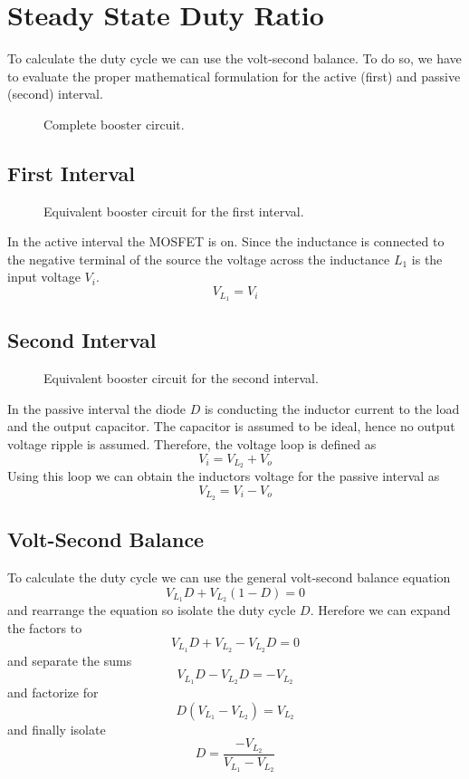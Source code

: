 \section{Steady State Duty Ratio}
To calculate the duty cycle we can use the volt-second balance.
To do so, we have to evaluate the proper mathematical formulation
for the active (first) and passive (second) interval.

\begin{figure}[h!]
	\centering
	\def\svgscale{\schematicscale}
	
	\caption{Complete booster circuit.}
\end{figure}

\subsection{First Interval}

\begin{figure}[h!]
	\centering
	\def\svgscale{\schematicscale}
	
	\caption{Equivalent booster circuit for the first interval.}
\end{figure}

In the active interval the MOSFET is on. Since the inductance is
connected to the negative terminal of the source the voltage across
the inductance $L_1$ is the input voltage $V_i$. 
\[ V_{L_{1}} = V_i \]

\subsection{Second Interval}

\begin{figure}[h!]
	\centering
	\def\svgscale{\schematicscale}
	
	\caption{Equivalent booster circuit for the second interval.}
\end{figure}

In the passive interval the diode $D$ is conducting the inductor
current to the load and the output capacitor. The capacitor is assumed
to be ideal, hence no output voltage ripple is assumed. Therefore, the
voltage loop is defined as
\[ V_i = V_{L_{2}} + V_o \]
Using this loop we can obtain the inductors voltage for the passive
interval as
\[ V_{L_{2}} = V_i - V_o \]

\subsection{Volt-Second Balance}
To calculate the duty cycle we can use the general volt-second balance
equation
\[ V_{L_{1}} D + V_{L_{2}} (1-D) = 0 \]
and rearrange the equation so isolate the duty cycle $D$. Herefore
we can expand the factors to
\[ V_{L_{1}} D + V_{L_{2}} - V_{L_{2}} D = 0 \]
and separate the sums
\[ V_{L_{1}} D - V_{L_{2}} D = - V_{L_{2}} \]
and factorize for
\[ D (V_{L_{1}} - V_{L_{2}}) = V_{L_{2}} \]
and finally isolate 
\[ D = \frac{- V_{L_{2}}}{V_{L_{1}} - V_{L_{2}}} \]

